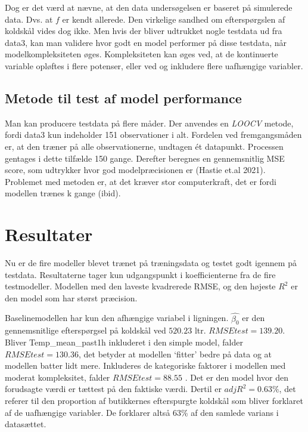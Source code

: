 \documentclass[
  12pt,
  a4paper,
  DIV=11,
  numbers=noendperiod]{scrartcl}
\begin{document}
Dog er det værd at nævne, at den data undersøgelsen er baseret på
simulerede data. Dvs. at \(f\) er kendt allerede. Den virkelige sandhed
om efterspørgslen af koldskål vides dog ikke. Men hvis der bliver
udtrukket nogle testdata ud fra data3, kan man validere hvor godt en
model performer på disse testdata, når modelkompleksiteten øges.
Kompleksiteten kan øges ved, at de kontinuerte variable opløftes i flere
potenser, eller ved og inkludere flere uafhængige variabler.

\hypertarget{metode-til-test-af-model-performance}{%
\subsection{Metode til test af model
performance}\label{metode-til-test-af-model-performance}}

Man kan producere testdata på flere måder. Der anvendes en \emph{LOOCV}
metode, fordi data3 kun indeholder 151 observationer i alt. Fordelen ved
fremgangsmåden er, at den træner på alle observationerne, undtagen ét
datapunkt. Processen gentages i dette tilfælde 150 gange. Derefter
beregnes en gennemsnitlig MSE score, som udtrykker hvor god
modelpræcisionen er (Hastie et.al 2021). Problemet med metoden er, at
det kræver stor computerkraft, det er fordi modellen trænes k gange
(ibid).

\hypertarget{resultater}{%
\section{Resultater}\label{resultater}}

Nu er de fire modeller blevet trænet på træningsdata og testet godt
igennem på testdata. Resultaterne tager kun udgangspunkt i
koefficienterne fra de fire testmodeller. Modellen med den laveste
kvadrerede RMSE, og den højeste \(R^2\) er den model som har størst
præcision.

Baselinemodellen har kun den afhængige variabel i ligningen.
\(\hat{\beta_0}\) er den gennemsnitlige efterspørgsel på koldskål ved
\(520.23\) ltr. \(RMSEtest=139.20\). Bliver Temp\_mean\_past1h
inkluderet i den simple model, falder \(RMSEtest=130.36\), det betyder
at modellen `fitter' bedre på data og at modellen batter lidt mere.
Inkluderes de kategoriske faktorer i modellen med moderat kompleksitet,
falder \(RMSEtest=88.55\) . Det er den model hvor den forudsagte værdi
er tættest på den faktiske værdi. Dertil er \(adjR^2 = 0.63\%\), det
referer til den proportion af butikkernes efterspurgte koldskål som
bliver forklaret af de uafhængige variabler. De forklarer altså 63\% af
den samlede varians i datasættet.
\end{document}

